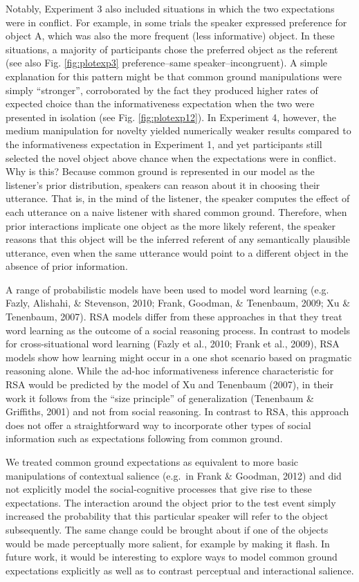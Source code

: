 \documentclass[10pt, letterpaper]{article}
\begin{document}
Notably, Experiment 3 also included situations in which the two
expectations were in conflict. For example, in some trials the speaker
expressed preference for object A, which was also the more frequent
(less informative) object. In these situations, a majority of
participants chose the preferred object as the referent (see also Fig.
\ref{fig:plotexp3} preference--same speaker--incongruent). A simple
explanation for this pattern might be that common ground manipulations
were simply ``stronger'', corroborated by the fact they produced higher
rates of expected choice than the informativeness expectation when the
two were presented in isolation (see Fig. \ref{fig:plotexp12}). In
Experiment 4, however, the medium manipulation for novelty yielded
numerically weaker results compared to the informativeness expectation
in Experiment 1, and yet participants still selected the novel object
above chance when the expectations were in conflict. Why is this?
Because common ground is represented in our model as the listener's
prior distribution, speakers can reason about it in choosing their
utterance. That is, in the mind of the listener, the speaker computes
the effect of each utterance on a naive listener with shared common
ground. Therefore, when prior interactions implicate one object as the
more likely referent, the speaker reasons that this object will be the
inferred referent of any semantically plausible utterance, even when the
same utterance would point to a different object in the absence of prior
information.

A range of probabilistic models have been used to model word learning
(e.g. Fazly, Alishahi, \& Stevenson, 2010; Frank, Goodman, \& Tenenbaum,
2009; Xu \& Tenenbaum, 2007). RSA models differ from these approaches in
that they treat word learning as the outcome of a social reasoning
process. In contrast to models for cross-situational word learning
(Fazly et al., 2010; Frank et al., 2009), RSA models show how learning
might occur in a one shot scenario based on pragmatic reasoning alone.
While the ad-hoc informativeness inference characteristic for RSA would
be predicted by the model of Xu and Tenenbaum (2007), in their work it
follows from the ``size principle'' of generalization (Tenenbaum \&
Griffiths, 2001) and not from social reasoning. In contrast to RSA, this
approach does not offer a straightforward way to incorporate other types
of social information such as expectations following from common ground.

We treated common ground expectations as equivalent to more basic
manipulations of contextual salience (e.g.~in Frank \& Goodman, 2012)
and did not explicitly model the social-cognitive processes that give
rise to these expectations. The interaction around the object prior to
the test event simply increased the probability that this particular
speaker will refer to the object subsequently. The same change could be
brought about if one of the objects would be made perceptually more
salient, for example by making it flash. In future work, it would be
interesting to explore ways to model common ground expectations
explicitly as well as to contrast perceptual and interactional salience.
\end{document}

